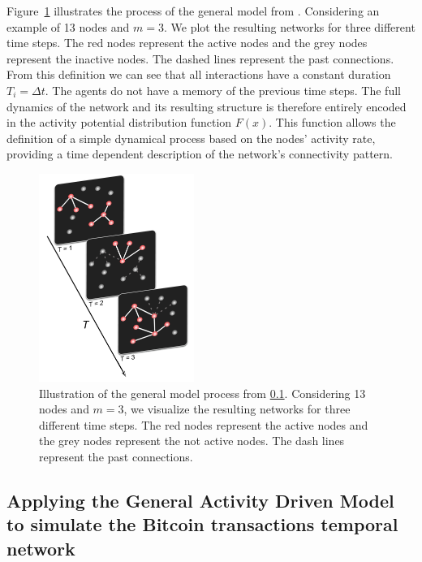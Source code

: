 \documentclass[../../thesis.tex]{subfiles}
\begin{document}
Figure~\ref{fig:activity_driven_model} illustrates the process of the general model from \cite{perra2012activity}. Considering an example of 13 nodes and $m=3$. We plot the  resulting networks for three different time steps. The red nodes represent the active nodes and the grey nodes represent the inactive nodes. The dashed lines represent the past connections. From this definition we can see that all interactions have a constant duration $T_{i}=\Delta t$. The agents do not have a memory of the previous time steps. The full dynamics of the network and its resulting structure is therefore entirely encoded in the activity potential distribution function $F(x)$. This function allows the definition of a simple dynamical process based on the nodes’ activity rate, providing a time dependent description of the network’s connectivity pattern.

\begin{figure}
\centering
\includegraphics[width=0.45\textwidth]{content/modelling/img/activity_driven_model}
\caption{Illustration of the general model process from \ref{sec:activity_driven_model_network}. Considering 13 nodes and $m=3$, we visualize the resulting networks for three different time steps. The red nodes represent the active nodes and the grey nodes represent the not active nodes. The dash lines represent the past connections.}
\label{fig:activity_driven_model}
\end{figure}

\subsection{Applying the General Activity Driven Model to simulate the Bitcoin transactions temporal network}
\label{sec:activity_driven_model_network}
\end{document}
